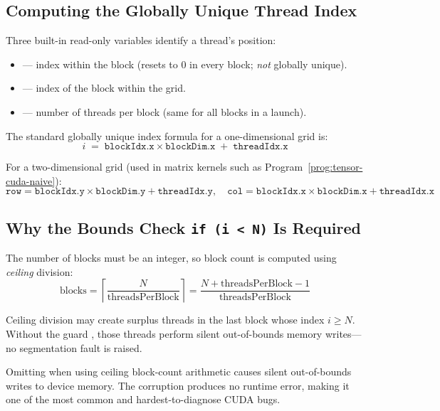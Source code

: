 \subsection{Computing the Globally Unique Thread Index}
\label{ssec:thread-index}

Three built-in read-only variables identify a thread's position:

\begin{itemize}
  \item {} --- index within the block (resets to 0 in
    every block; \emph{not} globally unique).
  \item {} --- index of the block within the grid.
  \item {} --- number of threads per block (same for all
    blocks in a launch).
\end{itemize}

The standard globally unique index formula for a one-dimensional grid is:
\[
  i \;=\; \texttt{blockIdx.x} \times \texttt{blockDim.x}
          \;+\; \texttt{threadIdx.x}
\]

For a two-dimensional grid (used in matrix kernels such as
Program~\ref{prog:tensor-cuda-naive}):
\[
  \texttt{row} = \texttt{blockIdx.y} \times \texttt{blockDim.y}
               + \texttt{threadIdx.y}, \quad
  \texttt{col} = \texttt{blockIdx.x} \times \texttt{blockDim.x}
               + \texttt{threadIdx.x}
\]

\subsection{Why the Bounds Check \texttt{if (i < N)} Is Required}
\label{ssec:bounds-check}

The number of blocks must be an integer, so block count is computed using
\emph{ceiling} division:
\[
  \text{blocks}
  = \left\lceil \frac{N}{\text{threadsPerBlock}} \right\rceil
  = \frac{N + \text{threadsPerBlock} - 1}{\text{threadsPerBlock}}
\]

Ceiling division may create surplus threads in the last block whose index
$i \geq N$. Without the guard , those threads perform
silent out-of-bounds memory writes---no segmentation fault is raised.

\begin{pppitfall}
Omitting  when using ceiling block-count arithmetic
causes silent out-of-bounds writes to device memory. The corruption produces
no runtime error, making it one of the most common and hardest-to-diagnose
CUDA bugs.
\end{pppitfall}

